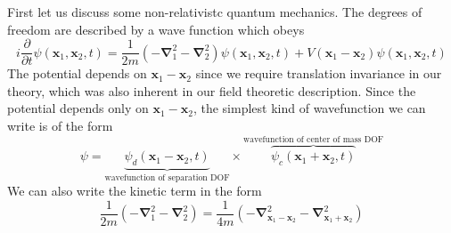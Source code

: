 \documentclass[11pt]{article}
\newcommand{\del}{\partial}
\numberwithin{equation}{section}
\begin{document}
    First let us discuss some non-relativistc quantum mechanics. The degrees of freedom are described by a wave function which obeys
    \begin{equation*}
        i\frac{\del}{\del t}\psi(\textbf{x}_1, \textbf{x}_2,t) = \frac{1}{2m}\left( -\mathbf\nabla_1^2 - \mathbf\nabla_2^2 \right) \psi(\textbf{x}_1, \textbf{x}_2,t) + V(\textbf{x}_1 - \textbf{x}_2)\psi(\textbf{x}_1, \textbf{x}_2,t) 
    \end{equation*}
    The potential depends on \(\textbf{x}_1-\textbf{x}_2\) since we require translation invariance in our theory, which was also inherent in our field theoretic description. Since the potential depends only on \(\textbf{x}_1 - \textbf{x}_2\), the simplest kind of wavefunction we can write is of the form
    \begin{equation*}
        \psi = \underbrace{\psi_d(\textbf{x}_1 - \textbf{x}_2, t)}_{\text{wavefunction of separation DOF}}\times \overbrace{\psi_c(\textbf{x}_1 + \textbf{x}_2, t)}^{\text{wavefunction of center of mass DOF}}
    \end{equation*} 
    We can also write the kinetic term in the form 
    \begin{equation*}
        \frac{1}{2m}\left( -\mathbf\nabla_1^2 - \mathbf\nabla_2^2 \right) = \frac{1}{4m}\left( -\mathbf\nabla_{\textbf{x}_1 - \textbf{x}_2}^2 - \mathbf\nabla_{\textbf{x}_1 + \textbf{x}_2}^2 \right)
    \end{equation*}
\end{document}
